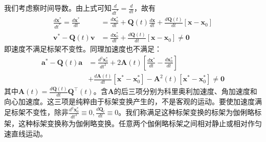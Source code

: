 \documentclass[main.tex]{subfiles}
\begin{document}
我们考虑察时间导数。由上式可知$\frac{d}{dt^*}=\frac{d}{dt}$，故有
\begin{align*}
    \frac{d\mathbf{x}^*}{dt^*}=\frac{d\mathbf{x}^*}{dt}&=\frac{d\mathbf{x}_0^*}{dt}+\mathbf{Q}\left(t\right)\frac{d\mathbf{x}}{dt}+\frac{d\mathbf{Q}\left(t\right)}{dt}\left[\mathbf{x}-\mathbf{x}_0\right]\\
    \mathbf{v}^*-\mathbf{Q}\left(t\right)\mathbf{v}&=\frac{d\mathbf{x}_0^*}{dt}+\frac{d\mathbf{Q}\left(t\right)}{dt}\left[\mathbf{x}-\mathbf{x}_0\right]\neq \mathbf{0}
\end{align*}
即速度不满足标架不变性。同理加速度也不满足：
\begin{align*}
\mathbf{a}^*-\mathbf{Q}\left(t\right)\mathbf{a}&=\frac{d^2\mathbf{x}_0^*}{dt^2}+2\mathbf{A}\left(t\right)\left[\frac{d\mathbf{x}^*}{dt}-\frac{d\mathbf{x}_0^*}{dt}\right]\\
&+\frac{d\mathbf{A}\left(t\right)}{dt}\left[\mathbf{x}^*-\mathbf{x}_0^*\right]-\mathbf{A}^2\left(t\right)\left[\mathbf{x}^*-\mathbf{x}_0^*\right]\neq \mathbf{0}
\end{align*}
其中$\mathbf{A}\left(t\right)=\frac{d\mathbf{Q}\left(t\right)}{dt}\mathbf{Q}^\intercal\left(t\right)$。含$\mathbf{A}$的后三项分别为科里奥利加速度、角加速度和向心加速度。这三项是纯粹由于标架变换产生的，不是客观的运动。要使加速度满足标架不变性，除非$\frac{d^2\mathbf{x}_0^*}{dt^2}\equiv 0,\frac{d\mathbf{Q}_t}{dt}\equiv 0$。我们称满足这种标架变换的标架为伽俐略标架，这种标架变换称为伽俐略变换。任意两个伽俐略标架之间相对静止或相对作匀速直线运动。
\end{document}

